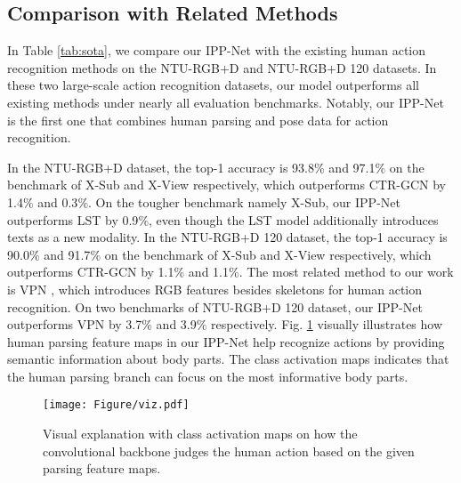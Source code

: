 \documentclass[runningheads]{llncs}
\begin{document}
\subsection{Comparison with Related Methods}
In Table \ref{tab:sota}, we compare our IPP-Net with the existing human action recognition methods on the NTU-RGB+D and NTU-RGB+D 120 datasets. In these two large-scale action recognition datasets, our model outperforms all existing methods under nearly all evaluation benchmarks. Notably, our IPP-Net is the first one that combines human parsing and pose data for action recognition. 

In the NTU-RGB+D dataset, the top-1 accuracy is 93.8$\%$ and 97.1$\%$ on the benchmark of X-Sub and X-View respectively, which outperforms CTR-GCN \cite{CTR-GCN2021} by 1.4$\%$ and 0.3$\%$. On the tougher benchmark namely X-Sub, our IPP-Net outperforms LST \cite{LST2022} by 0.9$\%$, even though the LST model additionally introduces texts as a new modality. In the NTU-RGB+D 120 dataset, the top-1 accuracy is 90.0$\%$ and 91.7$\%$ on the benchmark of X-Sub and X-View respectively, which outperforms CTR-GCN by 1.1$\%$ and 1.1$\%$. The most related method to our work is VPN \cite{vpn2020}, which introduces RGB features besides skeletons for human action recognition. On two benchmarks of NTU-RGB+D 120 dataset, our IPP-Net outperforms VPN by 3.7$\%$ and 3.9$\%$ respectively. Fig. \ref{viz} visually illustrates how human parsing feature maps in our IPP-Net help recognize actions by providing semantic information about body parts. The class activation maps indicates that the human parsing branch can focus on the most informative body parts.

\begin{figure}[t]
    \texttt{[image: Figure/viz.pdf]}
    \caption{Visual explanation with class activation maps on how the convolutional backbone judges the human action based on the given parsing feature maps.} 
    \label{viz}
\end{figure}
\end{document}
